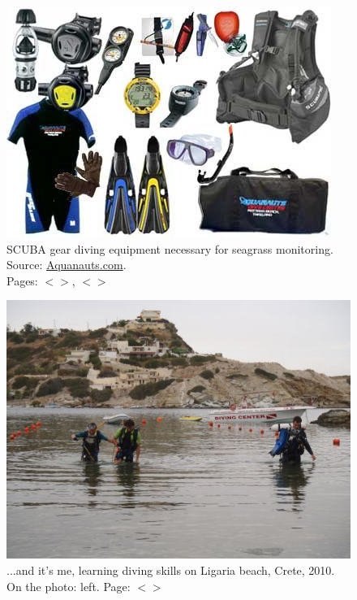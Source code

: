 \documentclass[11pt]{article}
\begin{document}
\begin{appendices}
\begin{figure}[H]
	\centering
	\includegraphics[scale=0.7]{SCUBA-gear.jpg}
	\caption{SCUBA gear diving equipment necessary for seagrass monitoring. Source: \href{http://divinginstructortraining.com/}{Aquanauts.com}. \\ Pages: $<$\pageref{page-15}$>$, $<$\pageref{page-25}$>$}
	\label{fig:A.52}
\end{figure}
\begin{figure}[H]
	\centering
	\includegraphics[scale=0.6]{Diving.jpg}
	\caption{...and it's me, learning diving skills on Ligaria beach, Crete, 2010. On the photo: left. Page: $<$\pageref{page-25}$>$}
	\label{fig:A.53}
\end{figure}


\end{appendices}
\end{document}
